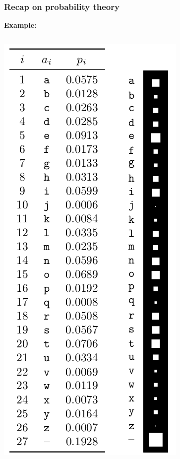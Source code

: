 \documentclass{beamer}
\begin{document}
\begin{frame}
	\frametitle{Recap on probability theory}
    \textbf{Example:}\\
	\begin{columns}
   \includegraphics[width=.8\textwidth]{e1}

\end{columns}
\end{frame}
\end{document}

